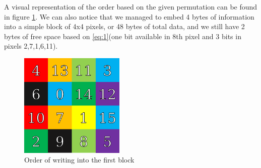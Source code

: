 \begin{multicols*}{2}
A visual representation of the order based on the given permutation can be found in figure \ref{scramble_example_first_block}. We can also notice that we managed to embed 4 bytes of information into a simple block of 4x4 pixels, or 48 bytes of total data, and we still have 2 bytes of free space based on \ref{eq:1}(one bit available in 8th pixel and 3 bits in pixels 2,7,1,6,11).

\begin{figure}[H]
    \centering
    \includegraphics[width=5cm,keepaspectratio]{pics/bmp_scrambling/first_block_marked}
    \caption{Order of writing into the first block}
    \label{scramble_example_first_block}
\end{figure}


\end{multicols*}
